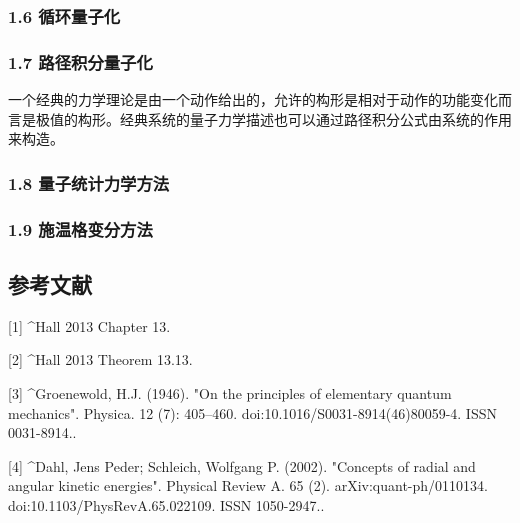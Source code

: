 \subsubsection{1.6 循环量子化}

\subsubsection{1.7 路径积分量子化}

一个经典的力学理论是由一个动作给出的，允许的构形是相对于动作的功能变化而言是极值的构形。经典系统的量子力学描述也可以通过路径积分公式由系统的作用来构造。

\subsubsection{1.8 量子统计力学方法}

\subsubsection{1.9 施温格变分方法}

\subsection{参考文献}
[1]
^Hall 2013 Chapter 13.

[2]
^Hall 2013 Theorem 13.13.

[3]
^Groenewold, H.J. (1946). "On the principles of elementary quantum mechanics". Physica. 12 (7): 405–460. doi:10.1016/S0031-8914(46)80059-4. ISSN 0031-8914..

[4]
^Dahl, Jens Peder; Schleich, Wolfgang P. (2002). "Concepts of radial and angular kinetic energies". Physical Review A. 65 (2). arXiv:quant-ph/0110134. doi:10.1103/PhysRevA.65.022109. ISSN 1050-2947..
